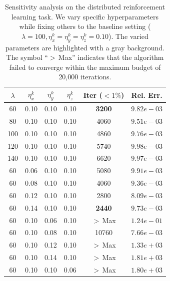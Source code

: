 \documentclass{article}
\theoremstyle{plain}
\theoremstyle{definition}
\theoremstyle{remark}
\begin{document}
\begin{table}[t]
    \centering
    \newcommand{\gc}{\cellcolor{gray!25}} 
\caption{Sensitivity analysis on the distributed reinforcement learning task. We vary specific hyperparameters while fixing others to the baseline setting ($\lambda=100, \eta_x^k=\eta_y^k=\eta_z^k=0.10$). The varied parameters are highlighted with a gray background. The symbol ``$>$\,Max'' indicates that the algorithm failed to converge within the maximum budget of 20,000 iterations.}
    \label{tab:sensitivity_analysis}
    \medskip
    
    \begin{tabular}{cccccc}
        \toprule
         $\lambda$ &  $\eta_x^k$ &  $\eta_y^k$ &  $\eta_z^k$ &  \textbf{Iter} ($<1\%$) & \textbf{Rel. Err.} \\
        \midrule
          \gc 60  & \gc 0.10 & \gc 0.10 & \gc 0.10 & \textbf{3200} & $9.82e-03$ \\
          \gc 80  & 0.10 & 0.10 & 0.10 & 4060 & $9.51e-03$ \\
          \gc 100 &  0.10 &  0.10 &  0.10 & 4860 & $9.76e-03$ \\
          \gc 120 & 0.10 & 0.10 & 0.10 & 5740 & $9.98e-03$ \\
          \gc 140 & 0.10 & 0.10 & 0.10 & 6620 & $9.97e-03$ \\
        \midrule
          60 & \gc 0.06 & 0.10 & 0.10 & 5080 & $9.91e-03$ \\
          60 & \gc 0.08 & 0.10 & 0.10 & 4060 & $9.36e-03$ \\
          60 & \gc 0.12 & 0.10 & 0.10 & 2800 & $8.09e-03$ \\
          60 & \gc 0.14 & 0.10 & 0.10 & \textbf{2440} & $9.73e-03$ \\
        \midrule
          60 & 0.10 & \gc 0.06 & 0.10 & $>$\,Max  & $1.24e-01$ \\
          60 & 0.10 & \gc 0.08 & 0.10 & 10760 & $7.66e-03$ \\
          60 & 0.10 & \gc 0.12 & 0.10 & $>$\,Max  & $1.33e+03$ \\
          60 & 0.10 & \gc 0.14 & 0.10 & $>$\,Max  & $1.81e+03$ \\
        \midrule
          60 & 0.10 & 0.10 & \gc 0.06 & $>$\,Max  & $1.80e+03$ \\

\end{tabular}
\end{table}
\end{document}
